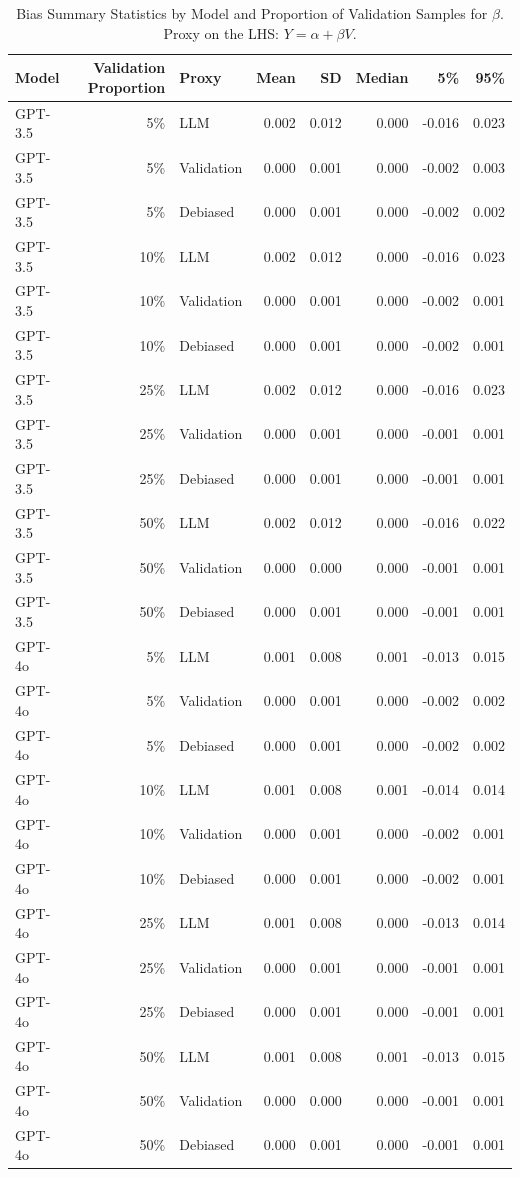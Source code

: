 \begin{table}

\caption{Bias Summary Statistics by Model and Proportion of Validation Samples for $\beta$. Proxy on the LHS: $Y = \alpha + \beta V$.}
\centering
\begin{tabular}[t]{lrlrrrrr}
\toprule
Model & Validation Proportion & Proxy & Mean & SD & Median & 5\% & 95\%\\
\midrule
GPT-3.5 & 5\% & LLM & 0.002 & 0.012 & 0.000 & -0.016 & 0.023\\
GPT-3.5 & 5\% & Validation & 0.000 & 0.001 & 0.000 & -0.002 & 0.003\\
GPT-3.5 & 5\% & Debiased & 0.000 & 0.001 & 0.000 & -0.002 & 0.002\\
GPT-3.5 & 10\% & LLM & 0.002 & 0.012 & 0.000 & -0.016 & 0.023\\
GPT-3.5 & 10\% & Validation & 0.000 & 0.001 & 0.000 & -0.002 & 0.001\\
GPT-3.5 & 10\% & Debiased & 0.000 & 0.001 & 0.000 & -0.002 & 0.001\\
GPT-3.5 & 25\% & LLM & 0.002 & 0.012 & 0.000 & -0.016 & 0.023\\
GPT-3.5 & 25\% & Validation & 0.000 & 0.001 & 0.000 & -0.001 & 0.001\\
GPT-3.5 & 25\% & Debiased & 0.000 & 0.001 & 0.000 & -0.001 & 0.001\\
GPT-3.5 & 50\% & LLM & 0.002 & 0.012 & 0.000 & -0.016 & 0.022\\
GPT-3.5 & 50\% & Validation & 0.000 & 0.000 & 0.000 & -0.001 & 0.001\\
GPT-3.5 & 50\% & Debiased & 0.000 & 0.001 & 0.000 & -0.001 & 0.001\\
GPT-4o & 5\% & LLM & 0.001 & 0.008 & 0.001 & -0.013 & 0.015\\
GPT-4o & 5\% & Validation & 0.000 & 0.001 & 0.000 & -0.002 & 0.002\\
GPT-4o & 5\% & Debiased & 0.000 & 0.001 & 0.000 & -0.002 & 0.002\\
GPT-4o & 10\% & LLM & 0.001 & 0.008 & 0.001 & -0.014 & 0.014\\
GPT-4o & 10\% & Validation & 0.000 & 0.001 & 0.000 & -0.002 & 0.001\\
GPT-4o & 10\% & Debiased & 0.000 & 0.001 & 0.000 & -0.002 & 0.001\\
GPT-4o & 25\% & LLM & 0.001 & 0.008 & 0.000 & -0.013 & 0.014\\
GPT-4o & 25\% & Validation & 0.000 & 0.001 & 0.000 & -0.001 & 0.001\\
GPT-4o & 25\% & Debiased & 0.000 & 0.001 & 0.000 & -0.001 & 0.001\\
GPT-4o & 50\% & LLM & 0.001 & 0.008 & 0.001 & -0.013 & 0.015\\
GPT-4o & 50\% & Validation & 0.000 & 0.000 & 0.000 & -0.001 & 0.001\\
GPT-4o & 50\% & Debiased & 0.000 & 0.001 & 0.000 & -0.001 & 0.001\\
\bottomrule
\end{tabular}
\end{table}
